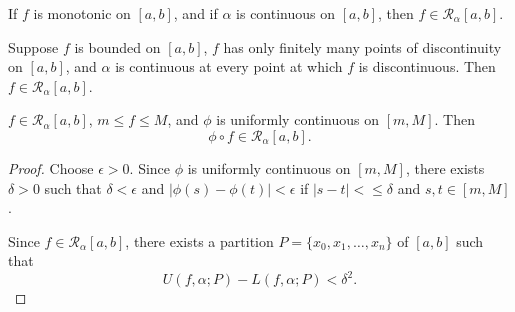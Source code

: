 \begin{proposition}
If $f$ is monotonic on $[a,b]$, and if $\alpha$ is continuous on $[a,b]$, then $f\in\mathcal{R}_\alpha[a,b]$.
\end{proposition}

\begin{proposition}
Suppose $f$ is bounded on $[a,b]$, $f$ has only finitely many points of discontinuity on $[a,b]$, and $\alpha$ is continuous at every point at which $f$ is discontinuous. Then $f\in \mathcal{R}_\alpha[a,b]$.
\end{proposition}

\begin{proposition}
$f\in \mathcal{R}_\alpha[a,b]$, $m\le f\le M$, and $\phi$ is uniformly continuous on $[m,M]$. Then
\[\phi\circ f\in \mathcal{R}_\alpha[a,b].\]
\end{proposition}

\begin{proof}
Choose $\epsilon>0$. Since $\phi$ is uniformly continuous on $[m,M]$, there exists $\delta>0$ such that $\delta<\epsilon$ and $|\phi(s)-\phi(t)|<\epsilon$ if $|s-t|<\le\delta$ and $s,t\in[m,M]$.

Since $f\in \mathcal{R}_\alpha[a,b]$, there exists a partition $P=\{x_0,x_1,\dots,x_n\}$ of $[a,b]$ such that
\[U(f,\alpha;P)-L(f,\alpha;P)<\delta^2.\]

\end{proof}

